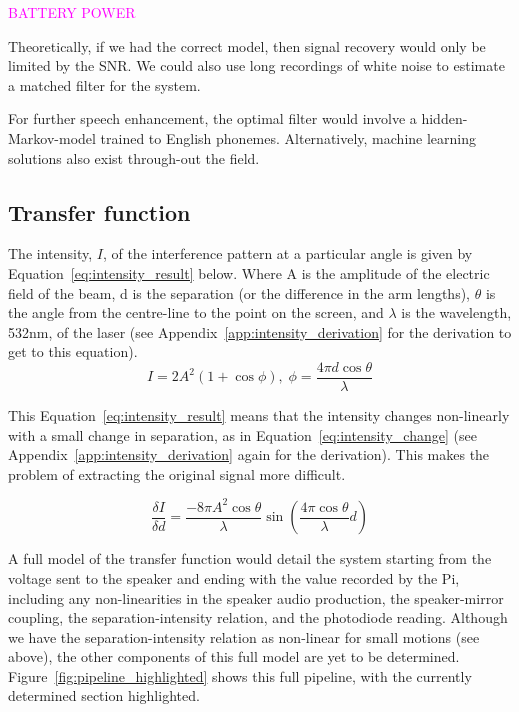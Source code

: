 \documentclass[prb,preprint]{revtex4-1}
\newcommand{\jam}{\textcolor{magenta}}
\begin{document}
\jam{BATTERY POWER}

Theoretically, if we had the correct model, then signal recovery would only be limited by the SNR. We could also use long recordings of white noise to estimate a matched filter for the system.


For further speech enhancement, the optimal filter would involve a hidden-Markov-model trained to English phonemes. Alternatively, machine learning solutions also exist through-out the field.


\subsection{Transfer function}

The intensity, $I$, of the interference pattern at a particular angle is given by Equation~\ref{eq:intensity_result} below. Where A is the amplitude of the electric field of the beam, d is the separation (or the difference in the arm lengths), $\theta$ is the angle from the centre-line to the point on the screen, and $\lambda$ is the wavelength, 532nm, of the laser (see Appendix~\ref{app:intensity_derivation} for the derivation to get to this equation).
\begin{equation}
\label{eq:intensity_result}
I = 2 A^2 (1+\cos{\phi}), \; \phi = \frac{4 \pi d \cos{\theta}}{\lambda}
\end{equation}

This Equation~\ref{eq:intensity_result} means that the intensity changes non-linearly with a small change in separation, as in Equation~\ref{eq:intensity_change} (see Appendix~\ref{app:intensity_derivation} again for the derivation). This makes the problem of extracting the original signal more difficult.

\begin{equation}
\label{eq:intensity_change}
	\frac{\delta I}{\delta d} = \frac{- 8 \pi A^2 \cos{\theta}}{\lambda} \sin{(\frac{4 \pi \cos{\theta}}{\lambda} d)}
\end{equation}

A full model of the transfer function would detail the system starting from the voltage sent to the speaker and ending with the value recorded by the Pi, including any non-linearities in the speaker audio production, the speaker-mirror coupling, the separation-intensity relation, and the photodiode reading. Although we have the separation-intensity relation as non-linear for small motions (see above), the other components of this full model are yet to be determined. Figure~\ref{fig:pipeline_highlighted} shows this full pipeline, with the currently determined section highlighted.
\end{document}
